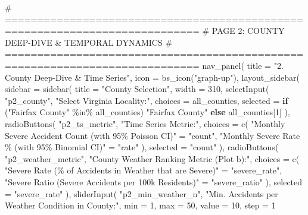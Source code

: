 \documentclass[
  letterpaper,
  DIV=11,
  numbers=noendperiod]{scrartcl}
\newenvironment{Shaded}{\begin{snugshade}}{\end{snugshade}}
\newcommand{\AttributeTok}[1]{\textcolor[rgb]{0.40,0.45,0.13}{#1}}
\newcommand{\CommentTok}[1]{\textcolor[rgb]{0.37,0.37,0.37}{#1}}
\newcommand{\ControlFlowTok}[1]{\textcolor[rgb]{0.00,0.23,0.31}{\textbf{#1}}}
\newcommand{\DecValTok}[1]{\textcolor[rgb]{0.68,0.00,0.00}{#1}}
\newcommand{\FunctionTok}[1]{\textcolor[rgb]{0.28,0.35,0.67}{#1}}
\newcommand{\NormalTok}[1]{\textcolor[rgb]{0.00,0.23,0.31}{#1}}
\newcommand{\OtherTok}[1]{\textcolor[rgb]{0.00,0.23,0.31}{#1}}
\newcommand{\SpecialCharTok}[1]{\textcolor[rgb]{0.37,0.37,0.37}{#1}}
\newcommand{\StringTok}[1]{\textcolor[rgb]{0.13,0.47,0.30}{#1}}
\begin{document}
\begin{Shaded}
\begin{Highlighting}[]
  \CommentTok{\# ============================================================================}
  \CommentTok{\# PAGE 2: COUNTY DEEP{-}DIVE \& TEMPORAL DYNAMICS}
  \CommentTok{\# ============================================================================}
  \FunctionTok{nav\_panel}\NormalTok{(}
    \AttributeTok{title =} \StringTok{"2. County Deep{-}Dive \& Time Series"}\NormalTok{,}
    \AttributeTok{icon =} \FunctionTok{bs\_icon}\NormalTok{(}\StringTok{"graph{-}up"}\NormalTok{),}
    \FunctionTok{layout\_sidebar}\NormalTok{(}
      \AttributeTok{sidebar =} \FunctionTok{sidebar}\NormalTok{(}
        \AttributeTok{title =} \StringTok{"County Selection"}\NormalTok{,}
        \AttributeTok{width =} \DecValTok{310}\NormalTok{,}
        \FunctionTok{selectInput}\NormalTok{(}
          \StringTok{"p2\_county"}\NormalTok{,}
          \StringTok{"Select Virginia Locality:"}\NormalTok{,}
          \AttributeTok{choices =}\NormalTok{ all\_counties,}
          \AttributeTok{selected =} \ControlFlowTok{if}\NormalTok{ (}\StringTok{"Fairfax County"} \SpecialCharTok{\%in\%}\NormalTok{ all\_counties) }\StringTok{"Fairfax County"} \ControlFlowTok{else}\NormalTok{ all\_counties[}\DecValTok{1}\NormalTok{]}
\NormalTok{        ),}
        \FunctionTok{radioButtons}\NormalTok{(}
          \StringTok{"p2\_ts\_metric"}\NormalTok{,}
          \StringTok{"Time Series Metric:"}\NormalTok{,}
          \AttributeTok{choices =} \FunctionTok{c}\NormalTok{(}
            \StringTok{"Monthly Severe Accident Count (with 95\% Poisson CI)"} \OtherTok{=} \StringTok{"count"}\NormalTok{,}
            \StringTok{"Monthly Severe Rate \% (with 95\% Binomial CI)"}        \OtherTok{=} \StringTok{"rate"}
\NormalTok{          ),}
          \AttributeTok{selected =} \StringTok{"count"}
\NormalTok{        ),}
        \FunctionTok{radioButtons}\NormalTok{(}
          \StringTok{"p2\_weather\_metric"}\NormalTok{,}
          \StringTok{"County Weather Ranking Metric (Plot b):"}\NormalTok{,}
          \AttributeTok{choices =} \FunctionTok{c}\NormalTok{(}
            \StringTok{"Severe Rate (\% of Accidents in Weather that are Severe)"} \OtherTok{=} \StringTok{"severe\_rate"}\NormalTok{,}
            \StringTok{"Severe Ratio (Severe Accidents per 100k Residents)"}      \OtherTok{=} \StringTok{"severe\_ratio"}
\NormalTok{          ),}
          \AttributeTok{selected =} \StringTok{"severe\_rate"}
\NormalTok{        ),}
        \FunctionTok{sliderInput}\NormalTok{(}
          \StringTok{"p2\_min\_weather\_n"}\NormalTok{,}
          \StringTok{"Min. Accidents per Weather Condition in County:"}\NormalTok{,}
          \AttributeTok{min =} \DecValTok{1}\NormalTok{, }\AttributeTok{max =} \DecValTok{50}\NormalTok{, }\AttributeTok{value =} \DecValTok{10}\NormalTok{, }\AttributeTok{step =} \DecValTok{1}

\end{Highlighting}
\end{Shaded}
\end{document}
